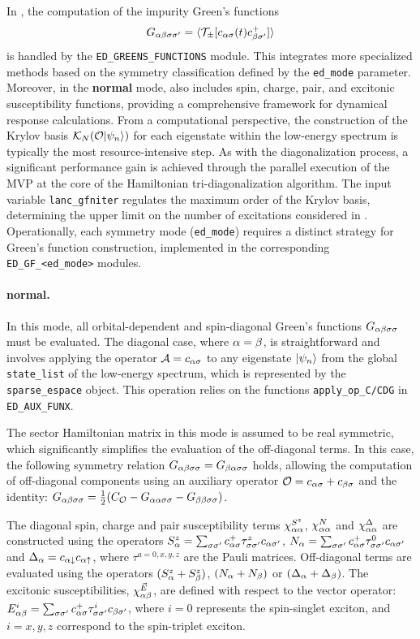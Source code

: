 \documentclass[edipack_sp.tex]{subfiles}
\begin{document}
In \NAME, the computation of the impurity Green's functions 
$$
G_{\alpha\beta\sigma\sigma'}=\langle {\cal T}_\pm[ c_{\alpha\sigma}(t) c_{\beta\sigma'}^+ ]\rangle
$$
is handled by the \texttt{ED\_GREENS\_FUNCTIONS} module.
This integrates more specialized methods based on the symmetry
classification defined by the \texttt{ed\_mode} parameter.
Moreover, in the {\bf normal} mode, \NAME also includes spin, charge, pair, and excitonic susceptibility functions, providing a comprehensive framework for dynamical response calculations.
From a computational perspective, the construction of the Krylov basis
$\mathcal{K}_N({\cal O}|\psi_n\rangle)$ for each eigenstate within the low-energy
spectrum is typically the most resource-intensive step.
As with the
diagonalization process, a significant performance gain is achieved through
the parallel execution of the MVP at the core of
the Hamiltonian tri-diagonalization algorithm.
The input variable
\texttt{lanc\_gfniter} regulates the maximum order of the Krylov basis,
determining the upper limit on the number of excitations considered in
.
Operationally, each symmetry mode (\texttt{ed\_mode}) requires a distinct
strategy for Green's function construction, implemented in the corresponding
\texttt{ED\_GF\_<ed\_mode>} modules.


\paragraph{{\bf normal}.}
In this mode, all orbital-dependent and spin-diagonal Green's 
functions $G_{\alpha\beta\sigma\sigma}$ must be evaluated. The diagonal 
case, where $\alpha=\beta$, is straightforward and involves applying 
the operator ${\cal A}=c_{\alpha\sigma}$ to any eigenstate $|\psi_n\rangle$ 
from the global {\tt state\_list} of the low-energy spectrum, 
which is represented by the {\tt sparse\_espace} object. This 
operation relies on the functions {\tt apply\_op\_C/CDG} in 
{\tt ED\_AUX\_FUNX}. 



The sector Hamiltonian matrix in this mode is assumed 
to be real symmetric, which significantly simplifies the evaluation of the off-diagonal terms. In this case, the following symmetry relation 
$G_{\alpha\beta\sigma\sigma}=G_{\beta\alpha\sigma\sigma}$ holds, allowing the computation of 
off-diagonal components using an auxiliary operator 
${\cal O}=c_{\alpha\sigma}+c_{\beta\sigma}$ and the identity:
$G_{\alpha\beta\sigma\sigma}=\tfrac{1}{2}(C_{\cal O} - G_{\alpha\alpha\sigma\sigma} - G_{\beta\beta\sigma\sigma})$.

The diagonal spin, charge and pair susceptibility terms
$\chi^{S^z}_{\alpha\alpha}$, $\chi^N_{\alpha\alpha}$ and $\chi^\Delta_{\alpha\alpha}$
are constructed using the operators $S^z_\alpha = \sum_{\sigma\sigma'} c^+_{\alpha\sigma}
\tau^z_{\sigma\sigma'} c_{\alpha\sigma'}$, 
$N_\alpha = \sum_{\sigma\sigma'} c^+_{\alpha\sigma} \tau^0_{\sigma\sigma'} c_{\alpha\sigma'}$
and $\Delta_\alpha = c_{\alpha\downarrow}c_{\alpha\uparrow}$,
where $\tau^{a=0,x,y,z}$ are the Pauli matrices.
Off-diagonal terms are  evaluated using the operators
$(S^z_\alpha + S^z_\beta)$, $(N_\alpha + N_\beta)$ or $(\Delta_\alpha + \Delta_\beta)$. 
The excitonic susceptibilities, $\chi^{\vec{E}}_{\alpha\beta}$, are defined with 
respect to the vector operator: $E^i_{\alpha\beta} = \sum_{\sigma\sigma'}
c^+_{\alpha\sigma}\tau^i_{\sigma\sigma'}c_{\beta\sigma'}$, where $i=0$ represents the
spin-singlet exciton, and $i=x,y,z$  correspond to the spin-triplet exciton.
\end{document}
